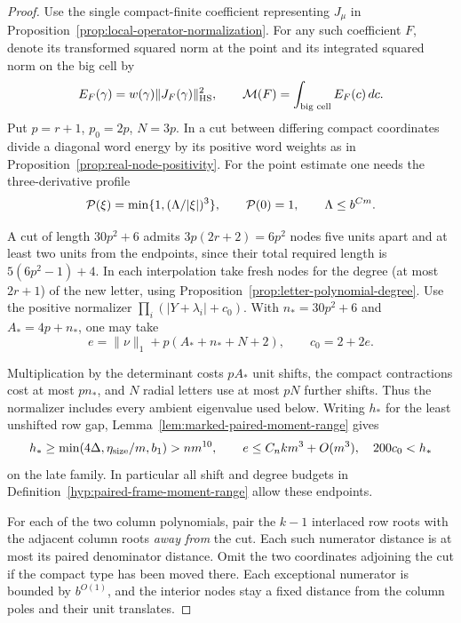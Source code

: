 \begin{proof}
Use the single compact-finite coefficient representing \(J_\mu\)
in Proposition~\ref{prop:local-operator-normalization}. For any such
coefficient \(F\), denote its transformed squared norm at the point
and its integrated squared norm on the big cell by
\[
 E_F(\gamma)=w(\gamma)\|J_F(\gamma)\|_{\rm HS}^2,\qquad
 {\cal M}(F)=\int_{\text{big cell}} E_F(c)\,dc .
\]
Put \(p=r+1\), \(p_0=2p\), \(N=3p\). In a cut between differing
compact coordinates divide a diagonal word energy by its positive
word weights as in Proposition~\ref{prop:real-node-positivity}.
For the point estimate one needs the three-derivative profile
\[
             {\cal P}(\xi)=\min\{1,(\Lambda/|\xi|)^3\},
             \qquad {\cal P}(0)=1,\qquad \Lambda\le b^{C m}.
\]

A cut of length \(30p^2+6\) admits \(3p(2r+2)=6p^2\) nodes
five units apart and at least two units from the endpoints, since their total required length is \(5(6p^2-1)+4\). In each interpolation take fresh
nodes for the degree (at most \(2r+1\)) of the new letter, using
Proposition~\ref{prop:letter-polynomial-degree}. Use the positive
normalizer \(\prod_i(|Y+\lambda_i|+c_0)\). With \(n_*=30p^2+6\)
and \(A_*=4p+n_*\), one may take
\[
 e=\|\nu\|_1+p(A_*+n_*+N+2),\qquad c_0=2+2e .
\]

Multiplication by the determinant costs \(pA_*\) unit shifts, the
compact contractions cost at most \(pn_*\), and \(N\) radial letters
use at most \(pN\) further shifts. Thus the normalizer includes every
ambient eigenvalue used below. Writing \(h_*\) for the least
unshifted row gap, Lemma~\ref{lem:marked-paired-moment-range} gives
\[
 h_* \ge \min(4\Delta,\eta_{\rm size}/m,b_1)>nm^{10},
 \qquad e\le C_nkm^3+O(m^3),\quad 200 c_0<h_*
\]
on the late family. In particular all shift and degree budgets in
Definition~\ref{hyp:paired-frame-moment-range} allow these endpoints.

For each of the two column polynomials, pair the \(k-1\) interlaced
row roots with the adjacent column roots \emph{away from} the cut.
Each such numerator distance is at most its paired denominator
distance. Omit the two coordinates adjoining the cut if the compact
type has been moved there. Each exceptional numerator is bounded
by \(b^{O(1)}\), and the interior nodes stay a fixed distance from
the column poles and their unit translates.


\end{proof}
